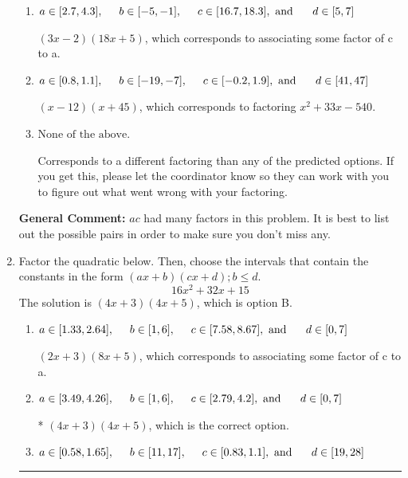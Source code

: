 \documentclass{extbook}[14pt]
\newcommand{\litem}[1]{\item #1

\rule{\textwidth}{0.4pt}}
\begin{document}
\begin{enumerate}
{\begin{enumerate}[label=\Alph*.]
 $(18x -2)(3x + 5)$, which corresponds to associating some factor of a to c.
\item \( a \in [2.7, 4.3], \hspace*{5mm} b \in [-5, -1], \hspace*{5mm} c \in [16.7, 18.3], \text{ and } \hspace*{5mm} d \in [5, 7] \)

 $(3x -2)(18x + 5)$, which corresponds to associating some factor of c to a.
\item \( a \in [0.8, 1.1], \hspace*{5mm} b \in [-19, -7], \hspace*{5mm} c \in [-0.2, 1.9], \text{ and } \hspace*{5mm} d \in [41, 47] \)

 $(x -12)(x + 45)$, which corresponds to factoring $x^{2} +33 x -540$.
\item \( \text{None of the above.} \)

 Corresponds to a different factoring than any of the predicted options. If you get this, please let the coordinator know so they can work with you to figure out what went wrong with your factoring.
\end{enumerate}

\textbf{General Comment:} $ac$ had many factors in this problem. It is best to list out the possible pairs in order to make sure you don't miss any.
}
\litem{
Factor the quadratic below. Then, choose the intervals that contain the constants in the form $(ax+b)(cx+d); b \leq d.$
\[ 16x^{2} +32 x + 15 \]The solution is \( (4x + 3)(4x + 5) \), which is option B.\begin{enumerate}[label=\Alph*.]
\item \( a \in [1.33, 2.64], \hspace*{5mm} b \in [1, 6], \hspace*{5mm} c \in [7.58, 8.67], \text{ and } \hspace*{5mm} d \in [0, 7] \)

 $(2x + 3)(8x + 5)$, which corresponds to associating some factor of c to a.
\item \( a \in [3.49, 4.26], \hspace*{5mm} b \in [1, 6], \hspace*{5mm} c \in [2.79, 4.2], \text{ and } \hspace*{5mm} d \in [0, 7] \)

* $(4x + 3)(4x + 5)$, which is the correct option.
\item \( a \in [0.58, 1.65], \hspace*{5mm} b \in [11, 17], \hspace*{5mm} c \in [0.83, 1.1], \text{ and } \hspace*{5mm} d \in [19, 28] \)


\end{enumerate}}
\end{enumerate}
\end{document}
